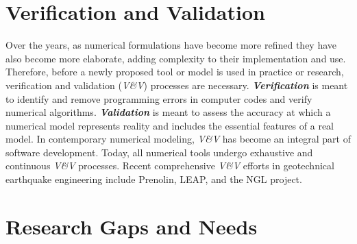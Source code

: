 \section{Verification and Validation} 
\label{sec:resp_geotech_7}

Over the years, as numerical formulations have become more refined they have also become more elaborate, adding complexity to their implementation and use. Therefore, before a newly proposed tool or model is used in practice or research, verification and validation (\emph{V\&V}) processes are necessary. \textbf{\emph{Verification}} is meant to identify and remove programming errors in computer codes and verify numerical algorithms. \textbf{\emph{Validation}} is meant to assess the accuracy at which a numerical model represents reality and includes the essential features of a real model. In contemporary numerical modeling, \emph{V\&V} has become an integral part of software development. Today, all numerical tools undergo exhaustive and continuous \emph{V\&V} processes. Recent comprehensive \emph{V\&V} efforts in geotechnical earthquake engineering include Prenolin, LEAP, and the NGL project. 

\section{Research Gaps and Needs}
\label{sec:resp_geotech_8}

